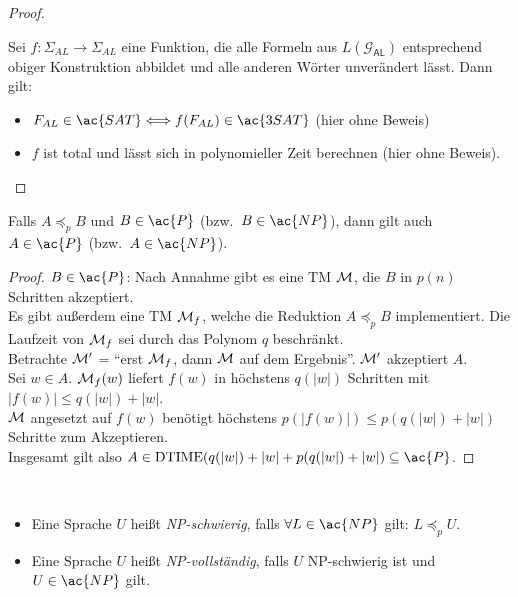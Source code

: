 \begin{proof}
\begin{enumerate}
\end{enumerate}

Sei $f:\Sigma_{AL}\rightarrow\Sigma_{AL}$ eine Funktion, die alle Formeln aus $L(\mathcal{G}_\mathsf{AL})$ entsprechend obiger Konstruktion abbildet und alle anderen Wörter unverändert lässt. Dann gilt:
\begin{itemize}
 \item $F_{AL}\in \ac{SAT} \<==> f(F_{AL})\in \ac{3SAT}$ (hier ohne Beweis)
 \item $f$ ist total und lässt sich in polynomieller Zeit berechnen (hier ohne Beweis).
 \qedhere
\end{itemize}
\end{proof}



\begin{lemma}\label{lem:A<B + BinP => AinP}
	Falls $A\preceq_p B$ und $B\in \ac{P}$ (bzw.\ $B\in \ac{NP}$), dann gilt auch $A\in \ac{P}$ (bzw.\ $A\in \ac{NP}$).
\end{lemma}
\begin{proof}
	$B\in \ac{P}$: Nach Annahme gibt es eine \ac{TM} $\mathcal{M}$, die $B$ in $p(n)$ Schritten akzeptiert.\\
	Es gibt außerdem eine \ac{TM} $\mathcal{M}_f$, welche die Reduktion $A\preceq_p B$ implementiert.
	Die Laufzeit von $\mathcal{M}_f$ sei durch das Polynom $q$ beschränkt.\\
	Betrachte $\mathcal{M}'$ = "`erst $\mathcal{M}_f$, dann $\mathcal{M}$ auf dem Ergebnis"'.
	$\mathcal{M}'$ akzeptiert $A$.\\
	Sei $w\in A$.
	$\mathcal{M}_f(w)$ liefert $f(w)$ in höchstens $q(|w|)$ Schritten mit $|f(w)|\leq q(|w|) + |w|$.\\
	$\mathcal{M}$ angesetzt auf $f(w)$ benötigt höchstens $p(|f(w)|)\leq p(q(|w|) + |w|)$ Schritte zum Akzeptieren.\\
	Insgesamt gilt also $A\in \DTIME(q(|w|) + |w|+p(q(|w|) + |w|)\subseteq \ac{P}$.
\end{proof}



\begin{Def}[name={[\ac{NP}-schwierig und \ac{NP}-vollständig]}]\
	\begin{itemize}
	\item Eine Sprache $U$ heißt \emph{\ac{NP}-schwierig}, falls $\forall L\in \ac{NP}$ gilt: $L\preceq_p U$.
	\item Eine Sprache $U$ heißt \emph{\ac{NP}-vollständig}, falls $U$ \ac{NP}-schwierig ist und $U\in \ac{NP}$ gilt. \qedhere
	\end{itemize}
\end{Def}

